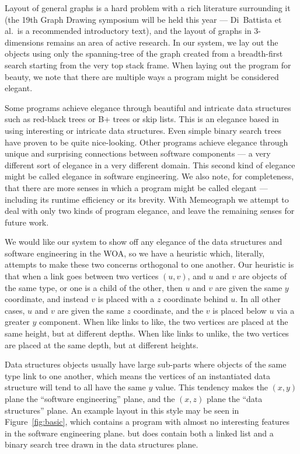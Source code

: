 \documentclass[11pt]{article}
\begin{document}
Layout of general graphs is a hard problem with a rich literature surrounding
it (the 19th Graph Drawing symposium will be held this year --- Di~Battista et
al.\cite{gd}\ is a recommended introductory text), and the layout of graphs in
3-dimensions remains an area of active research.  In our system, we lay out the
objects using only the spanning-tree of the graph created from a breadth-first
search starting from the very top stack frame.  When laying out the program for
beauty, we note that there are multiple ways a program might be considered
elegant. 

Some programs achieve elegance through beautiful and intricate data structures
such as red-black trees or B+ trees or skip lists.  This is an elegance based
in using interesting or intricate data structures.  Even simple binary search
trees have proven to be quite nice-looking.  Other programs achieve elegance
through unique and surprising connections between software components --- a
very different sort of elegance in a very different domain.  This second kind
of elegance might be called elegance in software engineering.  We also note, for completeness, that there are more
senses in which a program might be called elegant --- including its runtime
efficiency or its brevity.  With Memeograph we attempt to deal with only two
kinds of program elegance, and leave the remaining senses for future work.

We would like our system to show off any elegance of the data structures and
software engineering in the WOA, so we have a heuristic which, literally,
attempts to make these two concerns orthogonal to one another.  Our heuristic
is that when a link goes between two vertices $(u,v)$, and $u$ and $v$ are
objects of the same type, or one is a child of the other, then $u$ and $v$ are
given the same $y$ coordinate, and instead $v$ is placed with a $z$ coordinate
behind $u$.  In all other cases, $u$ and $v$ are given the same $z$ coordinate,
and the $v$ is placed below $u$ via a greater $y$ component.  When like links
to like, the two vertices are placed at the same height, but at different
depths.  When like links to unlike, the two vertices are placed at the same
depth, but at different heights.

Data structures objects usually have large sub-parts where objects of the same
type link to one another, which means the vertices of an instantiated data
structure will tend to all have the same $y$ value.  This tendency makes the
$(x,y)$ plane the ``software engineering'' plane, and the $(x,z)$ plane the
``data structures'' plane.  An example layout in this style may be seen in
Figure~\ref{fig:basic}, which contains a program with almost no interesting
features in the software engineering plane. but does contain both a linked list
and a binary search tree drawn in the data structures plane.  
\end{document}
